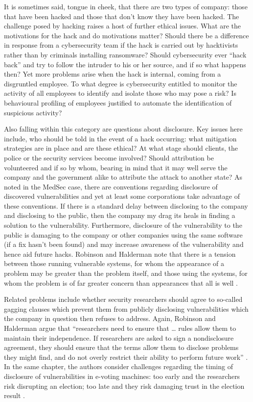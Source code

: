 \documentclass{svjour3}                     %
\begin{document}
It is sometimes said, tongue in cheek, that there are two types of company: those that have been hacked and those that don’t know they have been hacked. The challenge posed by hacking raises a host of further ethical issues. What are the motivations for the hack and do motivations matter? Should there be a difference in response from a cybersecurity team if the hack is carried out by hacktivists rather than by criminals installing ransomware? Should cybersecurity ever ``hack back'' and try to follow the intruder to his or her source, and if so what happens then? Yet more problems arise when the hack is internal, coming from a disgruntled employee. To what degree is cybersecurity entitled to monitor the activity of all employees to identify and isolate those who may pose a risk? Is behavioural profiling of employees justified to automate the identification of suspicious activity? 

Also falling within this category are questions about disclosure. Key issues here include, who should be told in the event of a hack occurring: what mitigation strategies are in place and are these ethical? At what stage should clients, the police or the security services become involved? Should attribution be volunteered and if so by whom, bearing in mind that it may well serve the company and the government alike to attribute the attack to another state? As noted in the MedSec case, there are conventions regarding disclosure of discovered vulnerabilities and yet at least some corporations take advantage of these conventions. If there is a standard delay between disclosing to the company and disclosing to the public, then the company my drag its heals in finding a solution to the vulnerability. Furthermore, disclosure of the vulnerability to the public is damaging to the company or other companies using the same software (if a fix hasn’t been found) and may increase awareness of the vulnerability and hence aid future hacks. Robinson and Halderman note that there is a tension between those running vulnerable systems, for whom the appearance of a problem may be greater than the problem itself, and those using the systems, for whom the problem is of far greater concern than appearances that all is well \cite[p. 122--126]{robinson2011ethical}.

Related problems include whether security researchers should agree to so-called gagging clauses which prevent them from publicly disclosing vulnerabilities which the company in question then refuses to address. Again, Robinson and Halderman argue that ``researchers need to ensure that … rules allow them to maintain their independence. If researchers are asked to sign a nondisclosure agreement, they should ensure that the terms allow them to disclose problems they might find, and do not overly restrict their ability to perform future work'' \cite[p.~123]{robinson2011ethical}. In the same chapter, the authors consider challenges regarding the timing of disclosure of vulnerabilities in e-voting machines: too early and the researchers risk disrupting an election; too late and they risk damaging trust in the election result \cite[p.~126]{robinson2011ethical}.
\end{document}
